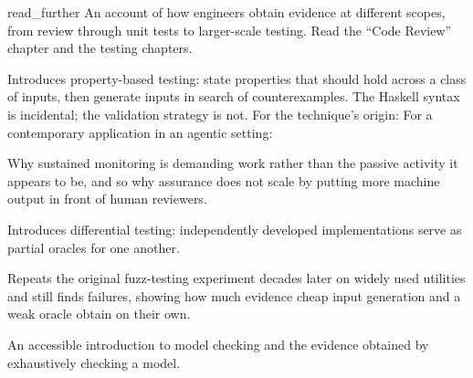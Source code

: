 \begin{bookbox}{read_further}{} %
\citep[chaps. 9 and 11--14]{winters2020} An account of how engineers obtain evidence at different scopes,
from review through unit tests to larger-scale testing. Read the ``Code Review'' chapter and the
testing chapters.

\citep{cockx2020quickcheck} Introduces property-based testing: state properties that should hold across a
class of inputs, then generate inputs in search of counterexamples. The Haskell syntax is
incidental; the validation strategy is not. For the technique's origin:
\citep{claessen2000quickcheck} For a contemporary application in an agentic setting:
\citep{anthropic2026propertytesting}

\citep{warm2008vigilance} Why sustained monitoring is demanding work rather than the passive activity it
appears to be, and so why assurance does not scale by putting more machine output in front of human
reviewers.

\citep{mckeeman1998differential} Introduces differential testing: independently developed implementations
serve as partial oracles for one another.

\citep{miller2022fuzz} Repeats the original fuzz-testing experiment decades later on widely used
utilities and still finds failures, showing how much evidence cheap input generation and a weak
oracle obtain on their own.

\citep{palshikar2004modelchecking} An accessible introduction to model checking and the evidence obtained
by exhaustively checking a model.
\end{bookbox}
